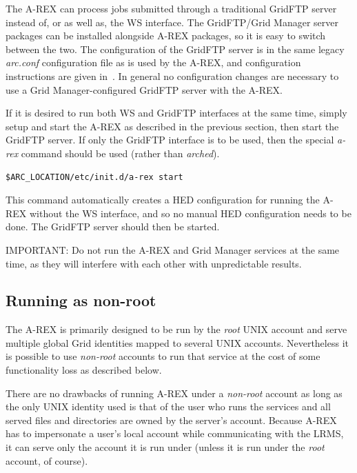 \documentclass{article}                            %
\begin{document}
The A-REX can process jobs submitted through a traditional GridFTP
server instead of, or as well as, the WS interface. The GridFTP/Grid
Manager server packages can be installed alongside A-REX packages, so
it is easy to switch between the two. The configuration of the GridFTP
server is in the same legacy \emph{arc.conf} configuration file as is
used by the A-REX, and configuration instructions are given
in~\cite{gm}. In general no configuration changes are necessary to use
a Grid Manager-configured GridFTP server with the A-REX.

If it is desired to run both WS and GridFTP interfaces at the same
time, simply setup and start the A-REX as described in the previous
section, then start the GridFTP server. If only the GridFTP interface
is to be used, then the special \emph{a-rex} command should be used
(rather than \emph{arched}).

\begin{shaded}
\begin{verbatim}
$ARC_LOCATION/etc/init.d/a-rex start
\end{verbatim}
\end{shaded}

This command automatically creates a HED configuration for running the
A-REX without the WS interface, and so no manual HED configuration
needs to be done. The GridFTP server should then be started.

\begin{framed}
IMPORTANT: Do not run the A-REX and Grid Manager services at the same
time, as they will interfere with each other with unpredictable
results.
\end{framed}


\subsection{Running as non-root}

The A-REX is primarily designed to be run by the \emph{root} UNIX
account and serve multiple global Grid identities mapped to several
UNIX accounts. Nevertheless it is possible to use \emph{non-root}
accounts to run that service at the cost of some functionality loss
as described below.

There are no drawbacks of running A-REX under a \emph{non-root} account
as long as the only UNIX identity used is that of the user who runs
the services and all served files and directories are owned by the
server's account. Because A-REX has to impersonate a user's local
account while communicating with the LRMS, it can serve only the account
it is run under (unless it is run under the \emph{root} account, of
course).
\end{document}
